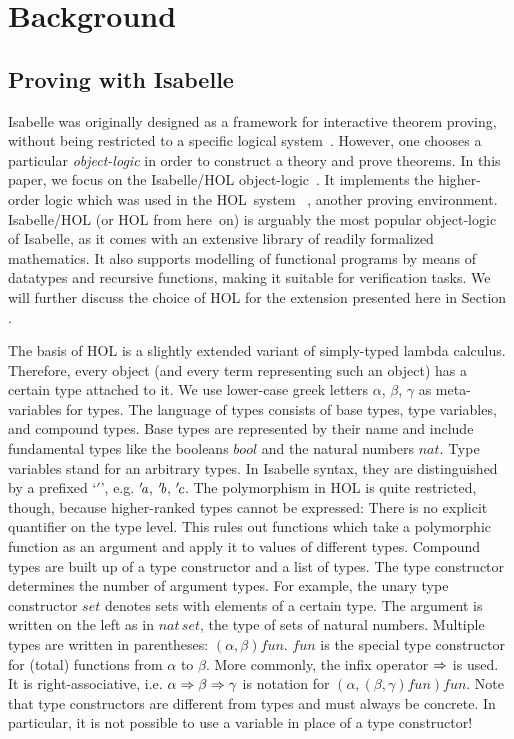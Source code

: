 \section{Background}\label{sec:background}

\subsection{Proving with Isabelle}\label{subsec:isabelle}

Isabelle was originally designed as a framework for interactive theorem
proving, without being restricted to a specific logical system~\cite{paulson90}.
However, one chooses a particular \emph{object-logic} in order to construct a
theory and prove theorems.
In this paper, we focus on the Isabelle/HOL object-logic~\cite{npw02}.
It implements the higher-order logic which was used in the HOL~system~
\cite{gordon93}, another proving environment.
Isabelle/HOL (or HOL from here~on) is arguably the most popular object-logic
of Isabelle, as it comes with an extensive library of readily formalized
mathematics.
It also supports modelling of functional programs by means of datatypes and
recursive functions, making it suitable for verification tasks.
We will further discuss the choice of HOL for the extension presented here in
Section \todo.

The basis of HOL is a slightly extended variant of simply-typed lambda calculus.
Therefore, every object (and every term representing such an object) has a
certain type attached to it.
We use lower-case greek letters $\alpha$, $\beta$, $\gamma$ as meta-variables
for types.
The language of types consists of base types, type variables, and compound
types.
Base types are represented by their name and include fundamental types like
the booleans $\mathit{bool}$ and the natural numbers $\mathit{nat}$.
Type variables stand for an arbitrary types.
In Isabelle syntax, they are distinguished by a prefixed `$'$', e.g.
$'\!\textit{a}$, $'\!\textit{b}$, $'\!\textit{c}$.
The polymorphism in HOL is quite restricted, though, because higher-ranked
types cannot be expressed:
There is no explicit quantifier on the type level.
This rules out functions which take a polymorphic function as an argument and
apply it to values of different types.
Compound types are built up of a type constructor and a list of types.
The type constructor determines the number of argument types.
For example, the unary type constructor $\mathit{set}$ denotes sets with
elements of a certain type.
The argument is written on the left as in $\mathit{nat\,set}$, the type of
sets of natural numbers.
Multiple types are written in parentheses: $(\alpha, \beta) \mathit{fun}$.
$\mathit{fun}$ is the special type constructor for (total) functions from
$\alpha$ to $\beta$.
More commonly, the infix operator $\Rightarrow$ is used.
It is right-associative, i.e. $\alpha \Rightarrow \beta \Rightarrow \gamma$ is notation for
$(\alpha, (\beta, \gamma) \mathit{fun}) \mathit{fun}$.
Note that type constructors are different from types and must always be
concrete.
In particular, it is not possible to use a variable in place of a type
constructor!

